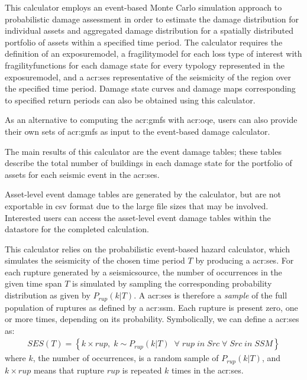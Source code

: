 This calculator employs an event-based Monte Carlo simulation approach to
probabilistic damage assessment in order to estimate the damage distribution for
individual \glspl{asset} and aggregated damage distribution for a spatially
distributed portfolio of \glspl{asset} within a specified time period. The
calculator requires the definition of an \gls{exposuremodel}, a
\gls{fragilitymodel} for each loss type of interest with
\glspl{fragilityfunction} for each damage state for every typology represented 
in the \gls{exposuremodel}, and a \glsdesc{acr:ses} representative of the 
seismicity of the region over the specified time period. Damage state curves 
and damage maps corresponding to specified return periods can also be 
obtained using this calculator.

As an alternative to computing the \glspl{acr:gmf} with \glsdesc{acr:oqe},
users can also provide their own sets of \glspl{acr:gmf} as input to the
event-based damage calculator.

The main results of this calculator are the event damage tables; these 
tables describe the total number of buildings in each damage state for the
portfolio of \glspl{asset} for each seismic event in the \gls{acr:ses}.

Asset-level event damage tables are generated by the calculator, but are
not exportable in csv format due to the large file sizes that may be
involved. Interested users can access the asset-level event damage tables
within the datastore for the completed calculation.


This calculator relies on the probabilistic event-based hazard calculator,
which simulates the seismicity of the chosen time period $T$ by producing a
\gls{acr:ses}. For each \gls{rupture} generated by a \gls{seismicsource}, the
number of occurrences in the given time span $T$ is simulated by sampling the
corresponding probability distribution as given by $P_{rup}(k | T)$. A
\gls{acr:ses} is therefore a \textit{sample} of the full population of
\glspl{rupture} as defined by a \glsdesc{acr:ssm}. Each \gls{rupture} is
present zero, one or more times, depending on its probability. Symbolically,
we can define a \gls{acr:ses} as:
\begin{align}
SES(T) = \left\{k \times rup,\;k\sim P_{rup}(k | T)\;\;\forall\;rup\;in\;Src\;\forall\;Src\;in\;SSM\right\}
\end{align}
where $k$, the number of occurrences, is a random sample of $P_{rup}(k | T)$,
and $k \times rup$ means that \gls{rupture} $rup$ is repeated $k$ times in the
\gls{acr:ses}.

